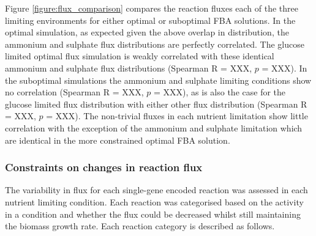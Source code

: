 Figure \vref{figure:flux_comparison} compares the reaction fluxes each of the three limiting environments for either optimal or suboptimal FBA solutions. In the optimal simulation, as expected given the above overlap in distribution, the ammonium and sulphate flux distributions are perfectly correlated. The glucose limited optimal flux simulation is weakly correlated with these identical ammonium and sulphate flux distributions (Spearman R = XXX, $p$ = XXX). In the suboptimal simulations the ammonium and sulphate limiting conditions show no correlation (Spearman R = XXX, $p$ = XXX), as is also the case for the glucose limited flux distribution with either other flux distribution (Spearman R = XXX, $p$ = XXX). The non-trivial fluxes in each nutrient limitation show little correlation with the exception of the ammonium and sulphate limitation which are identical in the more constrained optimal FBA solution.


\subsubsection{Constraints on changes in reaction flux}%

The variability in flux for each single-gene encoded reaction was assessed in each nutrient limiting condition. Each reaction was categorised based on the activity in a condition and whether the flux could be decreased whilst still maintaining the biomass growth rate. Each reaction category is described as follows.

